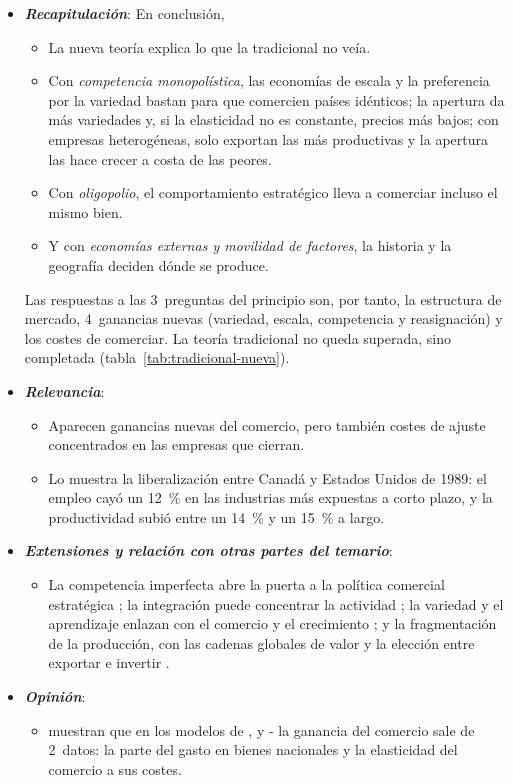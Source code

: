 \documentclass[11pt]{article}
\begin{document}
\begin{itemize}
\item \textbf{\emph{Recapitulación}}: En conclusión,
  \begin{itemize}
  \item La nueva teoría explica lo que la tradicional no veía.
  \item Con \emph{competencia monopolística}, las economías de escala y la preferencia por la variedad bastan para que comercien países idénticos; la apertura da más variedades y, si la elasticidad no es constante, precios más bajos; con empresas heterogéneas, solo exportan las más productivas y la apertura las hace crecer a costa de las peores.
  \item Con \emph{oligopolio}, el comportamiento estratégico lleva a comerciar incluso el mismo bien.
  \item Y con \emph{economías externas y movilidad de factores}, la historia y la geografía deciden dónde se produce.
  \end{itemize}
  Las respuestas a las 3~preguntas del principio son, por tanto, la estructura de mercado, 4~ganancias nuevas (variedad, escala, competencia y reasignación) y los costes de comerciar. La teoría tradicional no queda superada, sino completada (tabla~\ref{tab:tradicional-nueva}).
\item \textbf{\emph{Relevancia}}:
  \begin{itemize}
  \item Aparecen ganancias nuevas del comercio, pero también costes de ajuste concentrados en las empresas que cierran.

  \item Lo muestra la liberalización entre Canadá y Estados Unidos de 1989: el empleo cayó un 12~\% en las industrias más expuestas a corto plazo, y la productividad subió entre un 14~\% y un 15~\% a largo\nocite{Trefler2004Long}.
  \end{itemize}
\item \textbf{\emph{Extensiones y relación con otras partes del temario}}:
  \begin{itemize}
  \item La competencia imperfecta abre la puerta a la política comercial estratégica ; la integración puede concentrar la actividad ; la variedad y el aprendizaje enlazan con el comercio y el crecimiento\nocite{GrossmanHelpman1991Innovation} ; y la fragmentación de la producción, con las cadenas globales de valor y la elección entre exportar e invertir .
  \end{itemize}
\item \textbf{\emph{Opinión}}:
  \begin{itemize}
  \item \textcite{ArkolakisCostinotRodriguezClare2012New} muestran que en los modelos de ,  y - la ganancia del comercio sale de 2~datos: la parte del gasto en bienes nacionales y la elasticidad del comercio a sus costes.


\end{itemize}
\end{itemize}
\end{document}
